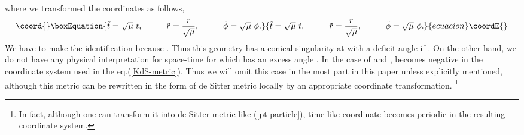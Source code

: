 \documentclass[a4paper,11pt]{article}
\begin{document}
where we transformed the coordinates as follows,
\begin{equation}\coord{}\boxEquation{
 \tilde{t}=\sqrt{\mu} ~t, \hspace{10mm}
 \tilde{r}=\frac{r}{\sqrt{\mu}}, \hspace{10mm}
 \tilde{\phi}=\sqrt{\mu} ~\phi.
}{
 \tilde{t}=\sqrt{\mu} ~t, \hspace{10mm}
 \tilde{r}=\frac{r}{\sqrt{\mu}}, \hspace{10mm}
 \tilde{\phi}=\sqrt{\mu} ~\phi.
}{ecuacion}\coordE{}\end{equation}
We have to make the identification 
\myHighlight{$\tilde{\phi} \sim \tilde{\phi}+2\pi \sqrt{\mu}$}\coordHE{} 
because \myHighlight{$\phi \sim \phi +2\pi$}\coordHE{}. 
Thus this geometry has a conical singularity at \coordHE{} with a deficit
angle \coordHE{} if \coordHE{}.
On the other hand, we do not have any physical interpretation 
for space-time for \coordHE{} which has an excess angle 
\myHighlight{$2\pi\left(\sqrt{\mu}-1\right)$}\coordHE{}.
In the case of \coordHE{} and \coordHE{}, \coordHE{} becomes negative 
in the coordinate system used in the eq.(\ref{KdS-metric}).
Thus we will omit this case in the most part in this paper 
unless explicitly mentioned, 
although this metric can be rewritten in the form of de Sitter
metric locally by an appropriate coordinate transformation.
\footnote{
In fact, although one can transform it into de Sitter metric like 
(\ref{pt-particle}), time-like coordinate becomes periodic 
in the resulting coordinate system.}
\end{document}
